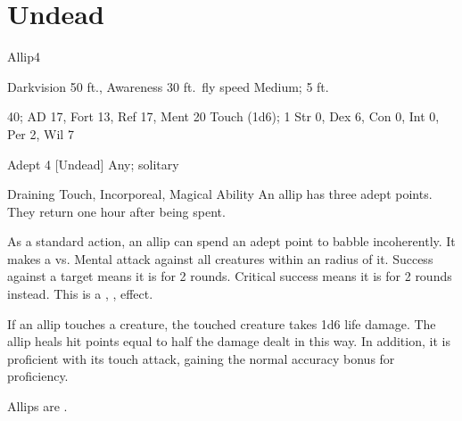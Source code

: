 \section{Undead}

    \begin{monsection}{Allip}{4}
        \begin{spellcontent}
            \begin{spelltargetinginfo}
                \pari {} Darkvision 50 ft., Awareness 
                \pari {} 30 ft.\ fly speed
                \pari {} Medium;  5 ft.
            \end{spelltargetinginfo}
            \begin{spelleffects}
                \pari {} 40;  AD 17, Fort 13, Ref 17, Ment 20
                \pari {} Touch  (1d6);  1
                \pari {} Str 0, Dex 6, Con 0, Int 0, Per 2, Wil 7
            \end{spelleffects}
        \end{spellcontent}
        \begin{spellfooter}
            \pari {} Adept 4 [Undead]
            \pari {} Any; solitary
        \end{spellfooter}
    \end{monsection}
     Draining Touch, Incorporeal, Magical Ability
     An allip has three adept points. They return one hour after being spent.

     As a standard action, an allip can spend an adept point to babble incoherently.
    It makes a  vs. Mental attack against all creatures within an \areamed radius of it.
    Success against a target means it is \disoriented for 2 rounds.
    Critical success means it is \confused for 2 rounds instead.
    This is a , ,  effect. 

     If an allip touches a creature, the touched creature takes 1d6  life damage.
    The allip heals hit points equal to half the damage dealt in this way.
    In addition, it is proficient with its touch attack, gaining the normal  accuracy bonus for proficiency.

     Allips are .
